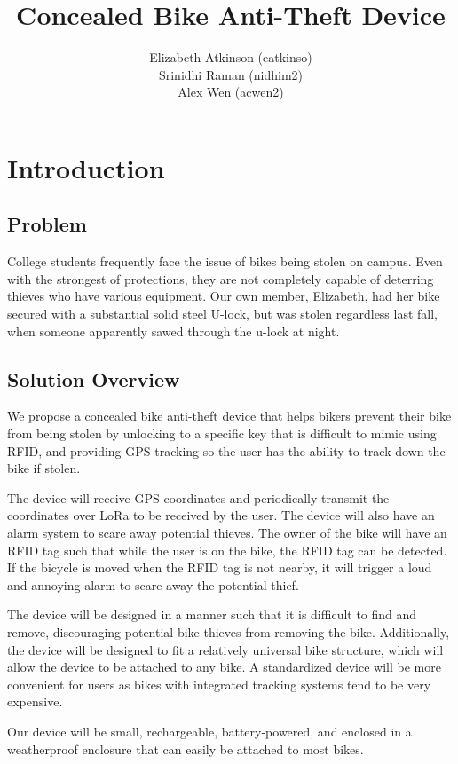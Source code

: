 \documentclass[]{article}
\title{Concealed Bike Anti-Theft Device}
\author{Elizabeth Atkinson (eatkinso)\\ Srinidhi Raman (nidhim2) \\ Alex Wen (acwen2) }
\begin{document}
\maketitle

\section{Introduction}
\subsection{Problem}

College students frequently face the issue of bikes being stolen on campus. Even with the strongest of protections, they are not completely capable of deterring thieves who have various equipment. Our own member, Elizabeth, had her bike secured with a substantial solid steel U-lock, but was stolen regardless last fall, when someone apparently sawed through the u-lock at night. 

\subsection{Solution Overview}
We propose a concealed bike anti-theft device that helps bikers prevent their bike from being stolen by unlocking to a specific key that is difficult to mimic using RFID, and providing GPS tracking so the user has the ability to track down the bike if stolen.

The device will receive GPS coordinates and periodically transmit the coordinates over LoRa to be received by the user. The device will also have an alarm system to scare away potential thieves. The owner of the bike will have an RFID tag such that while the user is on the bike, the RFID tag can be detected. If the bicycle is moved when the RFID tag is not nearby, it will trigger a loud and annoying alarm to scare away the potential thief.

The device will be designed in a manner such that it is difficult to find and remove, discouraging potential bike thieves from removing the bike. Additionally, the device will be designed to fit a relatively universal bike structure, which will allow the device to be attached to any bike. A standardized device will be more convenient for users as bikes with integrated tracking systems tend to be very expensive.

Our device will be small, rechargeable, battery-powered, and enclosed in a weatherproof enclosure that can easily be attached to most bikes.
\end{document}
